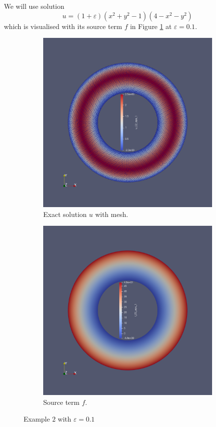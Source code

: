\documentclass[12pt]{ociamthesis}
\begin{document}
We will use solution
\begin{equation}
u = (1+\varepsilon)(x^2 + y^2 -1)(4-x^2-y^2)
\end{equation}
which is visualised with its source term $f$ in Figure \ref{E2_uf} at $\varepsilon = 0.1$.
\begin{figure}[H]
 \begin{subfigure}{0.5\textwidth}
     \includegraphics[width=\textwidth]{Pics/uf/U_E2_eps_1.png}
     \caption{Exact solution $u$ with mesh.}
 \end{subfigure}
   \begin{subfigure}{0.5\textwidth}
     \includegraphics[width=\textwidth]{Pics/uf/F_E2_eps_1.png}
     \caption{Source term $f$.}
 \end{subfigure}
 \caption{Example $2$ with $\varepsilon = 0.1$} \label{E2_uf}
\end{figure}
\end{document}
